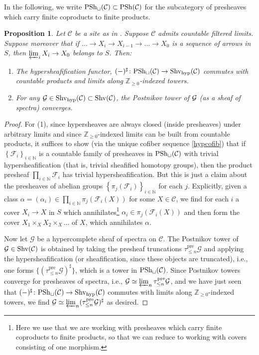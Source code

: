 \documentclass{amsart}
\newcommand{\sF}{\mathcal{F}}
\newcommand{\psh}{\mathrm{PSh}}
\newtheorem{proposition}[theorem]{Proposition}
\theoremstyle{definition}
\begin{document}
In the following, we write $\pshc(\mathcal{C}) \subset \psh(\mathcal{C})$ for
the subcategory of presheaves which carry finite coproducts
to finite products. 
\begin{proposition} 
\label{commutehypproducts}
Let $\mathcal{C}$ be a site as in 
. 
Suppose $\mathcal{C}$ admits countable filtered limits. 
Suppose moreover that 
if $\dots \to X_i \to X_{i-1} \to \dots \to X_0$ is a 
sequence of arrows in $S$, then $\varprojlim_i X_i \to X_0$ belongs to $S$. 
Then:  
\begin{enumerate}
\item  
The hypersheafification functor, 
$(-)^{\sharp} \colon \pshc(\mathcal{C}) \to \shvh(\mathcal{C})$ commutes 
with countable products and limits along $\mathbb{Z}_{\geq 0}$-indexed towers. 
\item
For any $\mathcal{G} \in \mathrm{Shv}_{\mathrm{hyp}}(\mathcal{C}) \subset \mathrm{Shv}(\mathcal{C})$, the Postnikov tower
of $\mathcal{G}$ (as a sheaf of spectra) converges. 
\end{enumerate}
\end{proposition} 
\begin{proof} 
For (1), 
since 
hypersheaves are always closed (inside presheaves) under arbitrary limits and
since $\mathbb{Z}_{\geq 0}$-indexed limits can be built from countable products, it
suffices to show (via the unique cofiber sequence \eqref{hypcofib}) that if 
$\left\{\sF_i\right\}_{i \in \mathbb{N}}$ is a countable family of presheaves in
$\pshc(\mathcal{C})$
with trivial hypersheafification (that is, trivial sheafified homotopy groups),
then the product presheaf $\prod_{i \in \mathbb{N}} \sF_i$ has trivial
hypersheafification.  
But this is just a claim about the presheaves of abelian groups
$\left\{\pi_j( \sF_i)\right\}_{i \in \mathbb{N}}$ for each $j$. 
Explicitly, given a class $\alpha = (\alpha_i) \in \prod_{i \in \mathbb{N}} \pi_j(
\sF_i(X))$ for some $X \in \mathcal{C}$, 
we find for each $i$ a cover $X_i \to X$
in $S$ which annihilates\footnote{Here we use that we are working with presheaves which
carry finite coproducts to finite products, so that we can reduce to working
with covers consisting of one morphism.} $\alpha_i \in \pi_j( \sF_i(X))$ and then form the cover 
$X_1 \times_X X_2 \times_X  \dots$ of $X$, which annihilates $\alpha$. 


Now let $\mathcal{G} $ be a hypercomplete sheaf of spectra on $\mathcal{C}$. 
The Postnikov tower of $\mathcal{G} \in \mathrm{Shv}(\mathcal{C})$ is obtained by taking the presheaf
truncations $\tau^{\mathrm{pre}}_{\leq n} \mathcal{G}$ and applying the hypersheafification (or
sheafification, since these objects are truncated), i.e., one forms 
$\{ (\tau^{\mathrm{pre}}_{\leq n} \mathcal{G})^{\sharp} \}$, which is a tower in
$\pshc(\mathcal{C})$. 
Since Postnikov towers converge for presheaves of spectra, i.e., $\mathcal{G}
\simeq \varprojlim_n \tau^{\mathrm{pre}}_{\leq n} \mathcal{G}$, and 
we have just seen that $(-)^{\sharp} \colon \pshc(\mathcal{C}) \to
\shvh(\mathcal{C})$ 
commutes with limits along $\mathbb{Z}_{\geq 0}$-indexed towers, we find $\mathcal{G} \simeq \varprojlim_n
(\tau_{\leq n}^{\mathrm{pre}} \mathcal{G})^{\sharp}$ as desired. 
\end{proof} 







\end{document}
